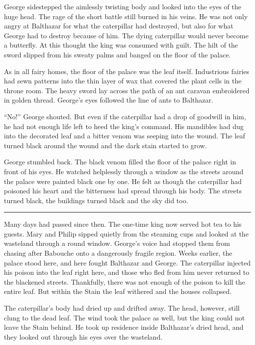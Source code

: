 \documentclass[10pt]{memoir}
\renewcommand{\pfbreakdisplay}{\bigskip \ding{166} \bigskip}
\newcommand{\secbreak}{\fancybreak{\pfbreakdisplay}}
\begin{document}
George sidestepped the aimlessly twisting body and looked into the eyes of the
huge head. The rage of the short battle still burned in his veins. He was not
only angry at Balthazar for what the caterpillar had destroyed, but also for
what George had to destroy because of him. The dying caterpillar would never
become a butterfly. At this thought the king was consumed with guilt. The hilt
of the sword slipped from his sweaty palms and banged on the floor of the
palace.

As in all fairy homes, the floor of the palace was the leaf itself. Industrious
fairies had sewn patterns into the thin layer of wax that covered the plant
cells in the throne room. The heavy sword lay across the path of an ant caravan
embroidered in golden thread. George's eyes followed the line of ants to
Balthazar.

``No!'' George shouted. But even if the caterpillar had a drop of goodwill in
him, he had not enough life left to heed the king's command. His mandibles had
dug into the decorated leaf and a bitter venom was seeping into the wound. The
leaf turned black around the wound and the dark stain started to grow.

George stumbled back. The black venom filled the floor of the palace right in
front of his eyes. He watched helplessly through a window as the streets around
the palace were painted black one by one. He felt as though the caterpillar had
poisoned his heart and the bitterness had spread through his body. The streets
turned black, the buildings turned black and the sky did too.

\secbreak

Many days had passed since then. The one-time king now served hot tea to his
guests. Mary and Philip sipped quietly from the steaming cups and looked at the
wasteland through a round window. George's voice had stopped them from chasing
after Babouche onto a dangerously fragile region. Weeks earlier, the palace
stood here, and here fought Balthazar and George. The caterpillar injected his
poison into the leaf right here, and those who fled from him never returned to
the blackened streets. Thankfully, there was not enough of the poison to kill
the entire leaf. But within the Stain the leaf withered and the houses
collapsed.

The caterpillar's body had dried up and drifted away. The head, however, still
clung to the dead leaf. The wind took the palace as well, but the king could
not leave the Stain behind. He took up residence inside Balthazar's dried head,
and they looked out through his eyes over the wasteland.
\end{document}
